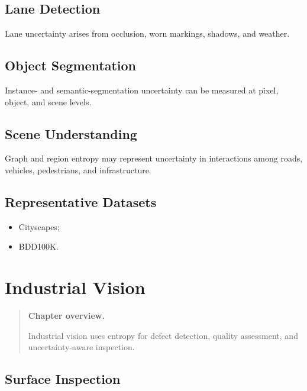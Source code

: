 \documentclass[11pt,oneside]{book}
\theoremstyle{remark}
\newenvironment{chapteroverview}
{
	\begin{quote}
		\small
		\textbf{Chapter overview.}
	}
	{
	\end{quote}
}
\newenvironment{datasetlist}
{
	\begin{itemize}[label=\(\triangleright\)]
	}
	{
	\end{itemize}
}
\begin{document}
	\section{Lane Detection}
	
	Lane uncertainty arises from occlusion, worn markings, shadows, and weather.
	
	\section{Object Segmentation}
	
	Instance- and semantic-segmentation uncertainty can be measured at pixel,
	object, and scene levels.
	
	\section{Scene Understanding}
	
	Graph and region entropy may represent uncertainty in interactions among roads,
	vehicles, pedestrians, and infrastructure.
	
	\section*{Representative Datasets}
	
	\begin{datasetlist}
		\item Cityscapes;
		\item BDD100K.
	\end{datasetlist}
	
	
	\chapter{Industrial Vision}
	\label{chap:industrial-vision}
	
	\begin{chapteroverview}
		Industrial vision uses entropy for defect detection, quality assessment, and
		uncertainty-aware inspection.
	\end{chapteroverview}
	
	\section{Surface Inspection}
	
\end{document}

